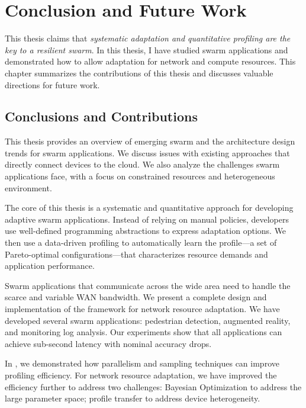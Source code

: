 \documentclass[thesis.tex]{subfiles}
\begin{document}
\chapter{Conclusion and Future Work}
\label{cha:concl-future-work}

This thesis claims that \textit{systematic adaptation and quantitative profiling
  are the key to a resilient swarm}. In this thesis, I have studied swarm
applications and demonstrated how to allow adaptation for network and compute
resources. This chapter summarizes the contributions of this thesis and
discusses valuable directions for future work.

\section{Conclusions and Contributions}
\label{sec:contributions}

 This thesis provides an overview of
emerging swarm and the architecture design trends for swarm applications. We
discuss issues with existing approaches that directly connect devices to the
cloud. We also analyze the challenges swarm applications face, with a focus on
constrained resources and heterogeneous environment.

 The core of this thesis is a
systematic and quantitative approach for developing adaptive swarm
applications. Instead of relying on manual policies, developers use well-defined
programming abstractions to express adaptation options. We then use a
data-driven profiling to automatically learn the profile---a set of
Pareto-optimal configurations---that characterizes resource demands and
application performance.

 Swarm applications
that communicate across the wide area need to handle the scarce and variable WAN
bandwidth. We present a complete design and implementation of the framework
\awstream{} for network resource adaptation. We have developed several swarm
applications: pedestrian detection, augmented reality, and monitoring log
analysis. Our experiments show that all applications can achieve sub-second
latency with nominal accuracy drops.

 In \awstream{}, we demonstrated how
parallelism and sampling techniques can improve profiling efficiency. For
network resource adaptation, we have improved the efficiency further to address
two challenges: Bayesian Optimization to address the large parameter space;
profile transfer to address device heterogeneity.
\end{document}
